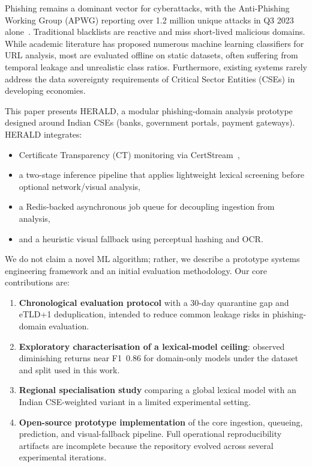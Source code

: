 \documentclass[conference]{IEEEtran}
\begin{document}
Phishing remains a dominant vector for cyberattacks, with the Anti-Phishing Working Group (APWG) reporting over 1.2 million unique attacks in Q3 2023 alone~\cite{apwg_report}. Traditional blacklists are reactive and miss short-lived malicious domains. While academic literature has proposed numerous machine learning classifiers for URL analysis, most are evaluated offline on static datasets, often suffering from temporal leakage and unrealistic class ratios. Furthermore, existing systems rarely address the data sovereignty requirements of Critical Sector Entities (CSEs) in developing economies.

This paper presents HERALD, a modular phishing-domain analysis prototype designed around Indian CSEs (banks, government portals, payment gateways). HERALD integrates:

\begin{itemize}
    \item Certificate Transparency (CT) monitoring via CertStream~\cite{certstream},
    \item a two-stage inference pipeline that applies lightweight lexical screening before optional network/visual analysis,
    \item a Redis-backed asynchronous job queue for decoupling ingestion from analysis,
    \item and a heuristic visual fallback using perceptual hashing and OCR.
\end{itemize}

We do not claim a novel ML algorithm; rather, we describe a prototype systems engineering framework and an initial evaluation methodology. Our core contributions are:

\begin{enumerate}
    \item \textbf{Chronological evaluation protocol} with a 30-day quarantine gap and eTLD+1 deduplication, intended to reduce common leakage risks in phishing-domain evaluation.
    \item \textbf{Exploratory characterisation of a lexical-model ceiling}: observed diminishing returns near F1~0.86 for domain-only models under the dataset and split used in this work.
    \item \textbf{Regional specialisation study} comparing a global lexical model with an Indian CSE-weighted variant in a limited experimental setting.
    \item \textbf{Open-source prototype implementation} of the core ingestion, queueing, prediction, and visual-fallback pipeline. Full operational reproducibility artifacts are incomplete because the repository evolved across several experimental iterations.
\end{enumerate}
\end{document}
